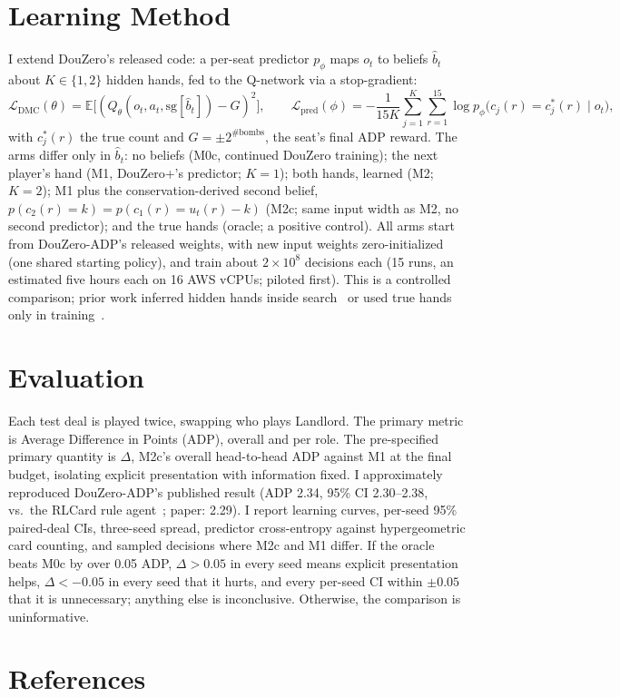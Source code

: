 \documentclass{article}
\begin{document}
\section{Learning Method}
I extend DouZero's released code: a per-seat predictor $p_\phi$ maps $o_t$ to beliefs $\hat b_t$ about $K\in\{1,2\}$ hidden hands, fed to the Q-network via a stop-gradient:
\[
\mathcal{L}_{\mathrm{DMC}}(\theta)=\mathbb{E}\big[(Q_\theta(o_t,a_t,\mathrm{sg}[\hat b_t])-G)^2\big],\qquad
\mathcal{L}_{\mathrm{pred}}(\phi)=-\frac{1}{15K}\sum_{j=1}^{K}\sum_{r=1}^{15}\log p_\phi\big(c_j(r)=c^{*}_j(r)\mid o_t\big),
\]
with $c^{*}_j(r)$ the true count and $G=\pm2^{\#\mathrm{bombs}}$, the seat's final ADP reward.
The arms differ only in $\hat b_t$:
no beliefs (M0c, continued DouZero training);
the next player's hand (M1, DouZero+'s predictor; $K{=}1$);
both hands, learned (M2; $K{=}2$);
M1 plus the conservation-derived second belief, $p(c_2(r){=}k)=p(c_1(r){=}u_t(r)-k)$ (M2c; same input width as M2, no second predictor);
and the true hands (oracle; a positive control).
All arms start from DouZero-ADP's released weights, with new input weights zero-initialized (one shared starting policy), and train about $2\times10^8$ decisions each (15 runs, an estimated five hours each on 16 AWS vCPUs; piloted first).
This is a controlled comparison; prior work inferred hidden hands inside search~\cite{jiang2019deltadou} or used true hands only in training~\cite{luo2024oadmcdou,yang2022perfectdou}.

\section{Evaluation}
Each test deal is played twice, swapping who plays Landlord.
The primary metric is Average Difference in Points (ADP), overall and per role.
The pre-specified primary quantity is $\Delta$, M2c's overall head-to-head ADP against M1 at the final budget, isolating explicit presentation with information fixed.
I approximately reproduced DouZero-ADP's published result (ADP 2.34, 95\% CI 2.30--2.38, vs.\ the RLCard rule agent~\cite{zha2019rlcard}; paper: 2.29).
I report learning curves, per-seed 95\% paired-deal CIs, three-seed spread, predictor cross-entropy against hypergeometric card counting, and sampled decisions where M2c and M1 differ.
If the oracle beats M0c by over 0.05 ADP, $\Delta>0.05$ in every seed means explicit presentation helps, $\Delta<-0.05$ in every seed that it hurts, and every per-seed CI within $\pm0.05$ that it is unnecessary; anything else is inconclusive. Otherwise, the comparison is uninformative.

\section*{References}

\renewcommand{\bibsection}{}
\medskip
{\small


}
\end{document}
